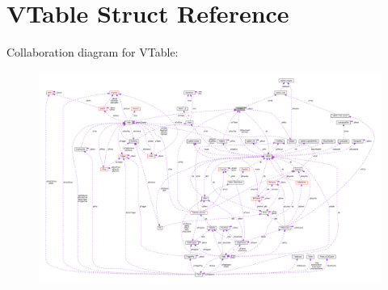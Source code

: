 \hypertarget{structVTable}{}\section{V\+Table Struct Reference}
\label{structVTable}


Collaboration diagram for V\+Table\+:\nopagebreak
\begin{figure}[H]
\begin{center}
\leavevmode
\includegraphics[width=350pt]{structVTable__coll__graph}
\end{center}
\end{figure}
